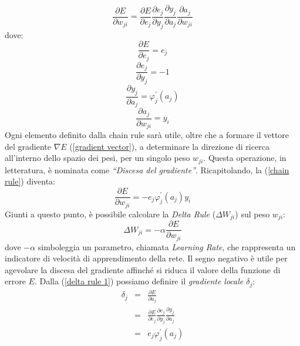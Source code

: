 \begin{equation}\label{chain rule}
    \frac{\partial E}{\partial w_{ji}} = \frac{\partial E}{\partial e_{j}} 
    \frac{\partial e_{j}}{\partial y_{j}}
    \frac{\partial y_{j}}{\partial a_{j}}
    \frac{\partial a_{j}}{\partial w_{ji}}
\end{equation}
dove:
\begin{equation}\label{derivation solved 1}
    \frac{\partial E}{\partial e_{j}} = e_j
\end{equation}
\begin{equation}\label{derivation solved 2}
    \frac{\partial e_{j}}{\partial y_{j}} = -1
\end{equation}
\begin{equation}\label{derivation solved 3}
    \frac{\partial y_{j}}{\partial a_{j}} = \varphi_j^{'}(a_j)
\end{equation}
\begin{equation}\label{derivation solved 4}
    \frac{\partial a_{j}}{\partial w_{ji}} = y_i
\end{equation}
Ogni elemento definito dalla chain rule sarà utile, oltre che a formare il vettore 
del gradiente $\nabla{E}$ (\ref{gradient vector}), a determinare la direzione di ricerca all’interno dello spazio 
dei pesi, per un singolo peso $w_{ji}$. Questa operazione, in letteratura, è nominata 
come \emph{“Discesa del gradiente”}. Ricapitolando, la (\ref{chain rule}) diventa:
\begin{equation}\label{chain rule update}
    \frac{\partial E}{\partial w_{ji}} = -e_j\varphi_j^{'}(a_j)y_i
\end{equation}
Giunti a questo punto, è possibile calcolare la \emph{Delta Rule} ($\Delta{W_{ji}}$) sul peso $w_{ji}$:
\begin{equation}\label{delta rule 1}
    \Delta{W_{ji}} = -\alpha \frac{\partial E}{\partial w_{ji}}
\end{equation}
dove $-\alpha$ simboleggia un parametro, chiamata \emph{Learning Rate}, che rappresenta 
un indicatore di velocità di apprendimento della rete. Il segno negativo è utile 
per agevolare la discesa del gradiente affinché si riduca il valore della funzione di
errore $E$. Dalla (\ref{delta rule 1}) possiamo definire il \emph{gradiente locale $\delta_j$}:
\begin{eqnarray}\label{local gradient of output layer}
    \delta_j & = & \frac{\partial E}{\partial a_{j}} \nonumber \\
             & = & \frac{\partial E}{\partial e_{j}} \frac{\partial e_{j}}{\partial y_{j}} \frac{\partial y_{j}}{\partial a_{j}} \nonumber \\
             & = & e_j\varphi_j^{'}(a_j)
\end{eqnarray}
